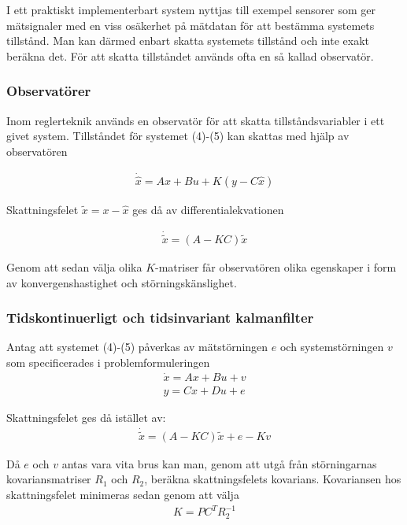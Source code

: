 \documentclass[a4paper,12pt,fleqn]{article}
\begin{document}
I ett praktiskt implementerbart system nyttjas till exempel sensorer som ger mätsignaler med en viss osäkerhet på mätdatan för att bestämma systemets tillstånd. Man kan därmed enbart skatta systemets tillstånd och inte exakt beräkna det. För att skatta tillståndet används ofta en så kallad observatör.

\subsubsection{Observatörer}

Inom reglerteknik används en observatör för att skatta tillståndsvariabler i ett givet system. Tillståndet för systemet (4)-(5) kan skattas med hjälp av observatören

\begin{gather}
\dot{\hat{x}} = Ax + Bu + K(y - C\hat{x})
\label{equ:observer}
\end{gather}

Skattningsfelet $\tilde{x}= x - \hat{x}$ ges då av differentialekvationen

\begin{gather}
\dot{\tilde{x}} = (A - KC)\tilde{x}
\label{equ:observerError}
\end{gather}

Genom att sedan välja olika $K$-matriser får observatören olika egenskaper i form av konvergenshastighet och störningskänslighet. 

\subsubsection{Tidskontinuerligt och tidsinvariant kalmanfilter}

Antag att systemet (4)-(5) påverkas av mätstörningen $e$ och systemstörningen $v$ som specificerades i problemformuleringen
\begin{gather}
\dot{x}=Ax+Bu+v \\
y=Cx+Du+e
\end{gather}

Skattningsfelet ges då istället av: 
\begin{gather}
\dot{\tilde{x}} = (A - KC)\tilde{x} + e - Kv
\end{gather}

Då $e$ och $v$ antas vara vita brus kan man, genom att utgå från störningarnas kovariansmatriser $R_1$ och $R_2$, beräkna skattningsfelets kovarians. Kovariansen hos skattningsfelet minimeras sedan genom att välja 
\begin{gather}
K = PC^{T}R_{2}^{-1}
\end{gather}
\end{document}
